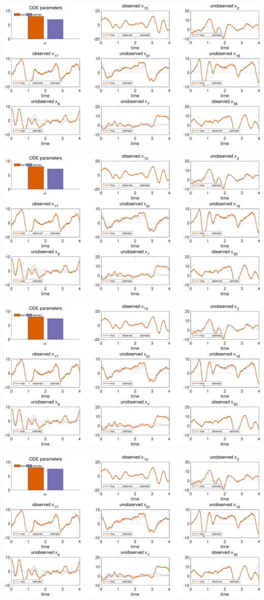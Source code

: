 {\includegraphics [width=5.5in]{VGM_for_Lorenz96_06.eps}

\includegraphics [width=5.5in]{VGM_for_Lorenz96_07.eps}

\includegraphics [width=5.5in]{VGM_for_Lorenz96_08.eps}

\includegraphics [width=5.5in]{VGM_for_Lorenz96_09.eps}

}
